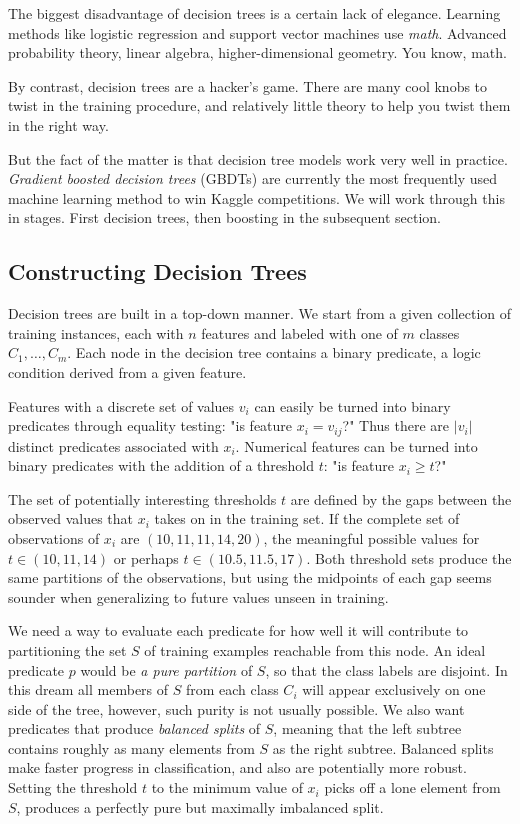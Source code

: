 \documentclass[10pt]{article}
\begin{document}
\begin{enumerate}
The biggest disadvantage of decision trees is a certain lack of elegance. Learning methods like logistic regression and support vector machines use \textit{math}. Advanced probability theory, linear algebra, higher-dimensional geometry. You know, math.

By contrast, decision trees are a hacker's game. There are many cool knobs to twist in the training procedure, and relatively little theory to help you twist them in the right way.

But the fact of the matter is that decision tree models work very well in practice. \textit{Gradient boosted decision trees} (GBDTs) are currently the most frequently used machine learning method to win Kaggle competitions. We will work through this in stages. First decision trees, then boosting in the subsequent section.

\subsection*{Constructing Decision Trees}
Decision trees are built in a top-down manner. We start from a given collection of training instances, each with $n$ features and labeled with one of $m$ classes $C_1, \ldots, C_m$. Each node in the decision tree contains a binary predicate, a logic condition derived from a given feature.

Features with a discrete set of values $v_i$ can easily be turned into binary predicates through equality testing: "is feature $x_i=v_{ij}$?" Thus there are $|v_i|$ distinct predicates associated with $x_i$. Numerical features can be turned into binary predicates with the addition of a threshold $t$: "is feature $x_i \geq t$?"

The set of potentially interesting thresholds $t$ are defined by the gaps between the observed values that $x_i$ takes on in the training set. If the complete set of observations of $x_i$ are $(10,11,11,14,20)$, the meaningful possible values for $t \in(10,11,14)$ or perhaps $t \in(10.5,11.5,17)$. Both threshold sets produce the same partitions of the observations, but using the midpoints of each gap seems sounder when generalizing to future values unseen in training.

We need a way to evaluate each predicate for how well it will contribute to partitioning the set $S$ of training examples reachable from this node. An ideal predicate $p$ would be\textit{ a pure partition} of $S$, so that the class labels are disjoint. In this dream all members of $S$ from each class $C_i$ will appear exclusively on one side of the tree, however, such purity is not usually possible. We also want predicates that produce \textit{balanced splits} of $S$, meaning that the left subtree contains roughly as many elements from $S$ as the right subtree. Balanced splits make faster progress in classification, and also are potentially more robust. Setting the threshold $t$ to the minimum value of $x_i$ picks off a lone element from $S$, produces a perfectly pure but maximally imbalanced split.


\end{enumerate}
\end{document}
